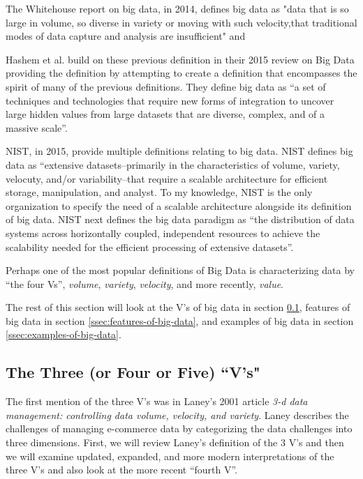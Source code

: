 \documentclass[]{article}
\begin{document}
The Whitehouse report on big data\cite{pcast}, in 2014, defines big data as "data that is so large in volume, so diverse in variety or moving with such velocity,that traditional modes of data capture and  analysis  are  insufficient" and 

Hashem et al.\cite{hashem_rise_2015} build on these previous definition in their 2015 review on Big Data providing the definition by attempting to create a definition that encompasses the spirit of many of the previous definitions. They define big data as ``a set of techniques and technologies that require new forms of integration to uncover large hidden values from large datasets that are diverse, complex, and of a massive scale''.

NIST, in 2015, \cite{nist_big_data_2015} provide multiple definitions relating to big data. NIST defines big data as ``extensive datasets--primarily in the characteristics of volume, variety, velocuty, and/or variability--that require a scalable architecture for efficient storage, manipulation, and analyst. To my knowledge, NIST is the only organization to specify the need of a scalable architecture alongside its definition of big data. NIST next defines the big data paradigm as ``the distribution of data systems across horizontally coupled, independent resources to achieve the scalability needed for the efficient processing of extensive datasets''.

Perhaps one of the most popular definitions of Big Data is characterizing data by ``the four Vs''\cite{hashem_rise_2015}, \textit{volume}, \textit{variety}, \textit{velocity}, and more recently, \textit{value}. 

The rest of this section will look at the V's of big data in section \ref{ssec:four-vs}, features of big data in section \ref{ssec:features-of-big-data}, and examples of big data in section \ref{ssec:examples-of-big-data}.

\subsection{The Three (or Four or Five) ``V's"}\label{ssec:four-vs}
The first mention of the three V's was in Laney's 2001 article \textit{3-d data management: controlling data volume, velocity, and variety}\cite{laney20013d}. Laney describes the challenges of managing e-commerce data by categorizing the data challenges into three dimensions. First, we will review Laney's definition of the 3 V's and then we will examine updated, expanded, and more modern interpretations of the three V's and also look at the more recent ``fourth V''.
\end{document}
